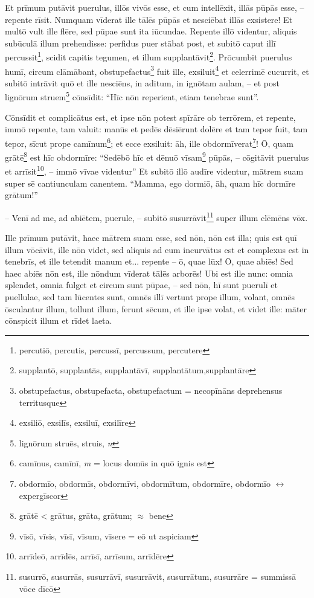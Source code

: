 \documentclass[a4paper, 12pt]{article}
\begin{document}
\begin{linenumbers}
	Et prīmum putāvit puerulus, illōs vivōs esse, et cum intellēxit, illās pūpās esse, -- repente rīsit.
	Numquam vīderat ille tālēs pūpās et nesciēbat illās exsistere!
	Et multō vult ille flēre, sed pūpae sunt ita iūcundae.
	Repente illō videntur, aliquis subūculā illum prehendisse:
	perfidus puer stābat post, et subitō caput illī percussit\footnote{percutiō, percutis, percussī, percussum, percutere}, scidit capitis tegumen, et illum supplantāvit\footnote{supplantō, supplantās, supplantāvī, supplantātum,supplantāre}.
	Prōcumbit puerulus humī, circum clāmābant, obstupefactus\footnote{obstupefactus, obstupefacta, obstupefactum = necopīnāns deprehensus territusque} fuit ille, exsiluit\footnote{exsiliō, exsilīs, exsiluī, exsilīre} et celerrimē cucurrit, et subitō intrāvit quō et ille nesciēns, in aditum, in ignōtam aulam, -- et post lignōrum struem\footnote{lignōrum struēs, struis, \textit{n}} cōnsīdit: ``Hīc nōn reperient, etiam tenebrae sunt''.
	
	Cōnsīdit et complicātus est, et ipse nōn potest spīrāre ob terrōrem, et repente, immō repente, tam valuit: manūs et pedēs dēsiērunt dolēre et tam tepor fuit, tam tepor, sīcut prope camīnum\footnote{camīnus, camīnī, \textit{m} = locus domūs in quō ignis est}; et ecce exsiluit: āh, ille obdormīverat\footnote{obdormīo, obdormīs, obdormīvi, obdormītum, obdormīre, obdormīo $\leftrightarrow$ expergīscor}!
	Ō, quam grātē\footnote{grātē < grātus, grāta, grātum; $\approx$ bene} est hīc obdormīre: ``Sedēbō hīc et dēnuō vīsam\footnote{vīsō, vīsis, vīsī, vīsum, vīsere = eō ut aspiciam} pūpās, -- cōgitāvit puerulus et arrīsit\footnote{arrīdeō, arrīdēs, arrīsī, arrīsum, arrīdēre}, -- immō vīvae videntur''
	Et subitō illō audīre videntur, mātrem suam super sē cantiunculam canentem.
	``Mamma, ego dormiō, āh, quam hīc dormīre grātum!''
	
	-- Venī ad me, ad abiētem, puerule, -- subitō susurrāvit\footnote{susurrō, susurrās, susurrāvī, susurrāvit, susurrātum, susurrāre = summissā vōce dīcō} super illum clēmēns vōx.
	
	Ille prīmum putāvit, haec mātrem suam esse, sed nōn, nōn est illa;
	quis est quī illum vōcāvit, ille nōn videt, sed aliquis ad eum incurvātus est et complexus est in tenebrīs, et ille tetendit manum et... repente -- ō, quae lūx! Ō, quae abiēs!
	Sed haec abiēs nōn est, ille nōndum vīderat tālēs arborēs!
	Ubi est ille nunc:
	omnia splendet, omnia fulget et circum sunt pūpae, -- sed nōn, hī sunt puerulī et puellulae, sed tam lūcentes sunt, omnēs illī vertunt prope illum, volant, omnēs ōsculantur illum, tollunt illum, ferunt sēcum, et ille ipse volat, et videt ille: māter cōnspicit illum et rīdet laeta.
	

\end{linenumbers}
\end{document}
